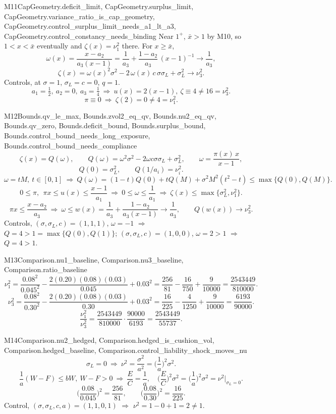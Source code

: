 \begin{mproof}{M11}{CapGeometry.deficit_limit, CapGeometry.surplus_limit, CapGeometry.variance_ratio_is_cap_geometry, CapGeometry.control_surplus_limit_needs_a1_lt_a3, CapGeometry.control_constancy_needs_binding}
Near $1^+$, $\bar x>1$ by M10, so $1<x<\bar x$ eventually and $\zeta(x)=\nu_1^2$ there.
For $x\ge\bar x$,
\[ \omega(x)=\frac{x-a_2}{a_3(x-1)}=\frac{1}{a_3}+\frac{1-a_2}{a_3}\,(x-1)^{-1}\to\frac{1}{a_3}, \]
\[ \zeta(x)=\omega(x)^2\sigma^2-2\,\omega(x)\,c\,\sigma\sigma_L+\sigma_L^2\to\nu_3^2 . \]
Controls, at $\sigma=1$, $\sigma_L=c=0$, $q=1$.
\[ a_1=\tfrac12,\ a_2=0,\ a_3=\tfrac14\ \Rightarrow\ u(x)=2(x-1),\ \zeta\equiv4\ne16=\nu_3^2. \]
\[ \pi\equiv0\ \Rightarrow\ \zeta(2)=0\ne4=\nu_1^2. \]
\end{mproof}

\begin{mproof}{M12}{Bounds.qv_le_max, Bounds.zvol2_eq_qv, Bounds.nu2_eq_qv, Bounds.qv_zero, Bounds.deficit_bound, Bounds.surplus_bound, Bounds.control_bound_needs_long_exposure, Bounds.control_bound_needs_compliance}
\[ \zeta(x)=Q(\omega),\qquad Q(\omega)=\omega^2\sigma^2-2\omega c\sigma\sigma_L+\sigma_L^2,\qquad \omega=\frac{\pi(x)\,x}{x-1}, \]
\[ Q(0)=\sigma_L^2,\qquad Q(1/a_i)=\nu_i^2 . \]
\[ \omega=tM,\ t\in[0,1]\ \Rightarrow\ Q(\omega)=(1-t)Q(0)+tQ(M)+\sigma^2M^2(t^2-t)\le\max\{Q(0),Q(M)\} . \]
\[ 0\le\pi,\ \ \pi x\le u(x)\le\frac{x-1}{a_1}\ \Rightarrow\ 0\le\omega\le\frac1{a_1}\ \Rightarrow\ \zeta(x)\le\max\{\sigma_L^2,\nu_1^2\} . \]
\[ \pi x\le\frac{x-a_2}{a_3}\ \Rightarrow\ \omega\le w(x)=\frac1{a_3}+\frac{1-a_2}{a_3(x-1)}\to\frac1{a_3},\qquad Q(w(x))\to\nu_3^2 . \]
Controls, $(\sigma,\sigma_L,c)=(1,1,1)$, $\omega=-1$ $\Rightarrow$ $Q=4>1=\max\{Q(0),Q(1)\}$; $(\sigma,\sigma_L,c)=(1,0,0)$, $\omega=2>1$ $\Rightarrow$ $Q=4>1$.
\end{mproof}

\begin{mproof}{M13}{Comparison.nu1_baseline, Comparison.nu3_baseline, Comparison.ratio_baseline}
\[ \nu_1^2=\frac{0.08^2}{0.045^2}-\frac{2(0.20)(0.08)(0.03)}{0.045}+0.03^2=\frac{256}{81}-\frac{16}{750}+\frac{9}{10000}=\frac{2543449}{810000} . \]
\[ \nu_3^2=\frac{0.08^2}{0.30^2}-\frac{2(0.20)(0.08)(0.03)}{0.30}+0.03^2=\frac{16}{225}-\frac{4}{1250}+\frac{9}{10000}=\frac{6193}{90000} . \]
\[ \frac{\nu_1^2}{\nu_3^2}=\frac{2543449}{810000}\cdot\frac{90000}{6193}=\frac{2543449}{55737} . \]
\end{mproof}

\begin{mproof}{M14}{Comparison.nu2_hedged, Comparison.hedged_is_cushion_vol, Comparison.hedged_baseline, Comparison.control_liability_shock_moves_nu}
\[ \sigma_L=0\ \Rightarrow\ \nu^2=\frac{\sigma^2}{a^2}=\Big(\frac1a\Big)^2\sigma^2 . \]
\[ \frac1a(W-F)\le bW,\ W-F>0\ \Rightarrow\ \frac{E}{C}=\frac1a,\quad \Big(\frac{E}{C}\Big)^2\sigma^2=\Big(\frac1a\Big)^2\sigma^2=\nu^2\big|_{\sigma_L=0} . \]
\[ \Big(\frac{0.08}{0.045}\Big)^2=\frac{256}{81},\qquad \Big(\frac{0.08}{0.30}\Big)^2=\frac{16}{225} . \]
Control, $(\sigma,\sigma_L,c,a)=(1,1,0,1)$ $\Rightarrow$ $\nu^2=1-0+1=2\ne1$.
\end{mproof}

